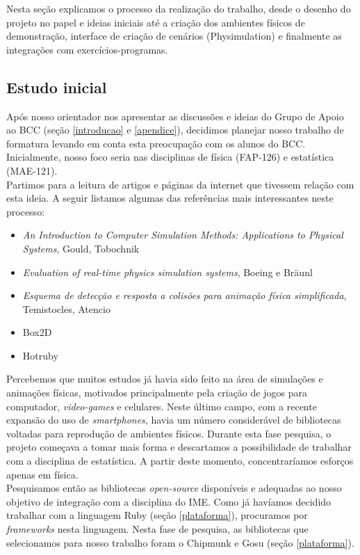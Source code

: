 Nesta seção explicamos o processo da realização do trabalho, desde o desenho do projeto no papel e ideias iniciais até a criação dos ambientes físicos de demonstração, interface de criação de cenários (Physimulation) e finalmente as integrações com exercícios-programas.

\subsection{Estudo inicial}
Após nosso orientador nos apresentar as discussões e ideias do Grupo de Apoio ao BCC (seção \ref{introducao} e \ref{apendice}), decidimos planejar nosso trabalho de formatura levando em conta esta preocupação com os alunos do BCC. Inicialmente, nosso foco seria nas disciplinas de física (FAP-126) e estatística (MAE-121). \\

Partimos para a leitura de artigos e páginas da internet que tivessem relação com esta ideia. A seguir listamos algumas das referências mais interessantes neste processo:
\begin{itemize}
	\item \textit{An Introduction to Computer Simulation Methods: Applications to Physical Systems}, Gould, Tobochnik
	\item \textit{Evaluation of real-time physics simulation systems}, Boeing e Bräunl
	\item \textit{Esquema de detecção e resposta a colisões para animação física simplificada}, Temistocles, Atencio
	\item Box2D
	\item Hotruby
\end{itemize}

Percebemos que muitos estudos já havia sido feito na área de simulações e animações físicas, motivados principalmente pela criação de jogos para computador, \textit{video-games} e celulares. Neste último campo, com a recente expansão do uso de \textit{smartphones}, havia um número considerável de bibliotecas voltadas para reprodução de ambientes físicos. Durante esta fase pesquisa, o projeto começava a tomar mais forma e descartamos a possibilidade de trabalhar com a disciplina de estatística. A partir deste momento, concentraríamos esforços apenas em física. \\

Pesquisamos então as bibliotecas \textit{open-source} disponíveis e adequadas ao nosso objetivo de integração com a disciplina do IME.
Como já havíamos decidido trabalhar com a linguagem Ruby (seção \ref{plataforma}), procuramos por \textit{frameworks} nesta linguagem. Nesta fase de pesquisa, as bibliotecas que selecionamos para nosso trabalho foram o Chipmunk e Gosu (seção \ref{plataforma}). 

